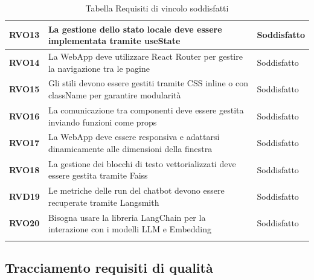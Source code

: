 \begin{longtable}{|>{\centering\arraybackslash}m{}|>{\centering\arraybackslash}m{}|>{\centering\arraybackslash}m{}|}
    \hline
    \textbf{RVO13} & La gestione dello stato locale deve essere implementata tramite useState & Soddisfatto \\
    \hline
    \textbf{RVO14} & La WebApp deve utilizzare React Router per gestire la navigazione tra le pagine & Soddisfatto \\
    \hline
    \textbf{RVO15} & Gli stili devono essere gestiti tramite CSS inline o con className per garantire modularità & Soddisfatto \\
    \hline
    \textbf{RVO16} & La comunicazione tra componenti deve essere gestita inviando funzioni come props & Soddisfatto \\
    \hline
    \textbf{RVO17} & La WebApp deve essere responsiva e adattarsi dinamicamente alle dimensioni della finestra & Soddisfatto \\
    \hline
    \textbf{RVO18} & La gestione dei blocchi di testo vettorializzati deve essere gestita tramite Faiss & Soddisfatto \\
    \hline
    \textbf{RVD19} & Le metriche delle run del chatbot devono essere recuperate tramite Langsmith & Soddisfatto \\
    \hline
    \textbf{RVO20} & Bisogna usare la libreria LangChain per la interazione con i modelli LLM e Embedding & Soddisfatto \\
    \hline
\caption{Tabella Requisiti di vincolo soddisfatti}
\end{longtable}
\newpage
\subsection{Tracciamento requisiti di qualità}

